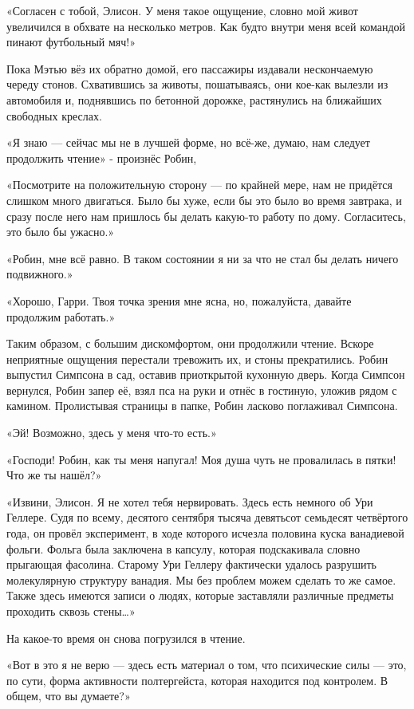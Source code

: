 \documentclass[a5paper, 9pt,
final, openany, twoside=true]{memoir}
\begin{document}
«Согласен с тобой, Элисон. У меня такое ощущение, словно мой живот увеличился в обхвате на несколько метров. Как будто внутри меня всей командой пинают футбольный мяч!»

Пока Мэтью вёз их обратно домой, его пассажиры издавали нескончаемую череду стонов. Схватившись за животы, пошатываясь, они кое-как вылезли из автомобиля и, поднявшись по бетонной дорожке, растянулись на ближайших свободных креслах.

«Я знаю — сейчас мы не в лучшей форме, но всё-же, думаю, нам следует продолжить чтение» - произнёс Робин,

«Посмотрите на положительную сторону — по крайней мере, нам не придётся слишком много двигаться. Было бы хуже, если бы это было во время завтрака, и сразу после него нам пришлось бы делать какую-то работу по дому. Согласитесь, это было бы ужасно.»

«Робин, мне всё равно. В таком состоянии я ни за что не стал бы делать ничего подвижного.»

«Хорошо, Гарри. Твоя точка зрения мне ясна, но, пожалуйста, давайте продолжим работать.»\bigskip

Таким образом, с большим дискомфортом, они продолжили чтение. Вскоре неприятные ощущения перестали тревожить их, и стоны прекратились. Робин выпустил Симпсона в сад, оставив приоткрытой кухонную дверь. Когда Симпсон вернулся, Робин запер её, взял пса на руки и отнёс в гостиную, уложив рядом с камином. Пролистывая страницы в папке, Робин ласково поглаживал Симпсона.

«Эй! Возможно, здесь у меня что-то есть.»

«Господи! Робин, как ты меня напугал! Моя душа чуть не провалилась в пятки! Что же ты нашёл?»

«Извини, Элисон. Я не хотел тебя нервировать. Здесь есть немного об Ури Геллере. Судя по всему, десятого сентября тысяча девятьсот семьдесят четвёртого года, он провёл эксперимент, в ходе которого исчезла половина куска ванадиевой фольги. Фольга была заключена в капсулу, которая подскакивала словно прыгающая фасолина. Старому Ури Геллеру фактически удалось разрушить молекулярную структуру ванадия. Мы без проблем можем сделать то же самое. Также здесь имеются записи о людях, которые заставляли различные предметы проходить сквозь стены…»

На какое-то время он снова погрузился в чтение.

«Вот в это я не верю — здесь есть материал о том, что психические силы — это, по сути, форма активности полтергейста, которая находится под контролем. В общем, что вы думаете?»
\end{document}
